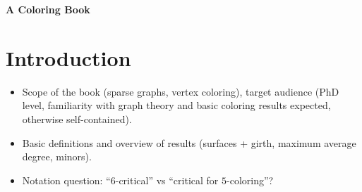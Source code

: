 \documentclass[12pt,twoside,openright,a4paper]{book}
\begin{document}
\pagestyle{empty}
\begin{titlepage}

\begin{center}

\vspace{10cm}

{\large\bf A Coloring Book}

\end{center}
\end{titlepage}

\newpage

\pagestyle{plain}
\tableofcontents

\newpage

\pagestyle{headings}
\setcounter{page}{1}

\chapter*{Introduction}
\begin{itemize}
\item Scope of the book (sparse graphs, vertex coloring), target audience (PhD level,
familiarity with graph theory and basic coloring results expected, otherwise self-contained).
\item Basic definitions and overview of results (surfaces + girth, maximum average degree,
minors).
\item Notation question: ``$6$-critical'' vs ``critical for $5$-coloring''?
\end{itemize}
% 
\end{document}
